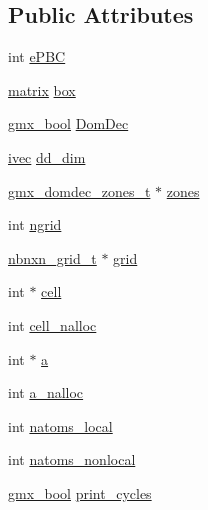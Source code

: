 \subsection*{\-Public \-Attributes}
\begin{DoxyCompactItemize}
\item 
int \hyperlink{structnbnxn__search_a1af6e6de4e4bb805c08fe2de305c4841}{e\-P\-B\-C}
\item 
\hyperlink{share_2template_2gromacs_2types_2simple_8h_a7ea9c2a830d3f743b887387e33645a83}{matrix} \hyperlink{structnbnxn__search_aaa50e6611ffa535f88030ec536196741}{box}
\item 
\hyperlink{include_2types_2simple_8h_a8fddad319f226e856400d190198d5151}{gmx\-\_\-bool} \hyperlink{structnbnxn__search_ab3c481c5b678882ad089402af6938cf2}{\-Dom\-Dec}
\item 
\hyperlink{share_2template_2gromacs_2types_2simple_8h_a74f6ffdb4a9c1764f5293969d8c681b6}{ivec} \hyperlink{structnbnxn__search_acf8855dca6b2d186c141c2adf0bcbb68}{dd\-\_\-dim}
\item 
\hyperlink{structgmx__domdec__zones__t}{gmx\-\_\-domdec\-\_\-zones\-\_\-t} $\ast$ \hyperlink{structnbnxn__search_abad2e1043fa0ba4d0a4128bb5ac3d740}{zones}
\item 
int \hyperlink{structnbnxn__search_a70174cf818bb4cd93614fa379e7a6c75}{ngrid}
\item 
\hyperlink{structnbnxn__grid__t}{nbnxn\-\_\-grid\-\_\-t} $\ast$ \hyperlink{structnbnxn__search_a0f7ffc5c2791f8849ef296a8d22ee81e}{grid}
\item 
int $\ast$ \hyperlink{structnbnxn__search_a69030c2000d8286be45c4f6b82bad057}{cell}
\item 
int \hyperlink{structnbnxn__search_ac886e4d0ed07e9b612e52943fe938943}{cell\-\_\-nalloc}
\item 
int $\ast$ \hyperlink{structnbnxn__search_a091b9827a5a8652fb3c58bc5cfc6267c}{a}
\item 
int \hyperlink{structnbnxn__search_a6025f60a2cde95ee95e8d81469d9061a}{a\-\_\-nalloc}
\item 
int \hyperlink{structnbnxn__search_a8d4cdde74c072067b715f834c4c886c9}{natoms\-\_\-local}
\item 
int \hyperlink{structnbnxn__search_adb4a8ce2cfc62dbfd06507fa3072bc16}{natoms\-\_\-nonlocal}
\item 
\hyperlink{include_2types_2simple_8h_a8fddad319f226e856400d190198d5151}{gmx\-\_\-bool} \hyperlink{structnbnxn__search_a7f63529b5a911e7164af45c21525a2ed}{print\-\_\-cycles}
\item 

\end{DoxyCompactItemize}

